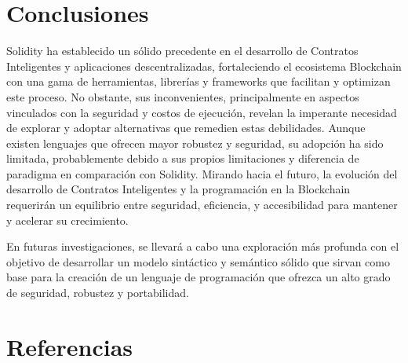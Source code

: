 \documentclass[a4paper,10pt]{article}
\begin{document}
	\section{Conclusiones}
	Solidity ha establecido un sólido precedente en el desarrollo de Contratos Inteligentes y aplicaciones descentralizadas, fortaleciendo el ecosistema Blockchain con una gama de herramientas, librerías y frameworks que facilitan y optimizan este proceso. No obstante, sus inconvenientes, principalmente en aspectos vinculados con la seguridad y costos de ejecución, revelan la imperante necesidad de explorar y adoptar alternativas que remedien estas debilidades. Aunque existen lenguajes que ofrecen mayor robustez y seguridad, su adopción ha sido limitada, probablemente debido a sus propios limitaciones y diferencia de paradigma en comparación con Solidity. Mirando hacia el futuro, la evolución del desarrollo de Contratos Inteligentes y la programación en la Blockchain requerirán un equilibrio entre seguridad, eficiencia, y accesibilidad para mantener y acelerar su crecimiento.
	
	En futuras investigaciones, se llevará a cabo una exploración más profunda con el objetivo de desarrollar un modelo sintáctico y semántico sólido que sirvan como base para la creación de un lenguaje de programación que ofrezca un alto grado de seguridad, robustez y portabilidad.
	\section{Referencias}
	\nocite{*}
	\printbibliography[heading=none]
\end{document}
